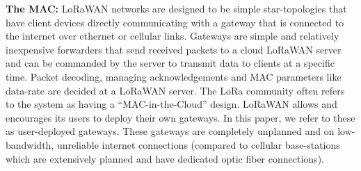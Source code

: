\vspace*{0.02in}

\noindent \textbf{The MAC: }  LoRaWAN networks
are designed to be simple star-topologies that have client devices directly
communicating with a gateway that is connected to the internet over ethernet
or cellular links. Gateways are simple and relatively inexpensive forwarders
that send received packets to a cloud LoRaWAN server and can be commanded by
the server to transmit data to clients at a specific time. Packet decoding,
managing acknowledgements and MAC parameters like data-rate are decided at a
LoRaWAN server. The LoRa community often refers to the system as having a
``MAC-in-the-Cloud'' design. LoRaWAN allows and encourages its users to deploy
their own gateways. In this paper, we refer to these as user-deployed gateways. These gateways are completely unplanned and on low-bandwidth,
unreliable internet connections (compared to cellular base-stations which are
extensively planned and have dedicated optic fiber connections). 



